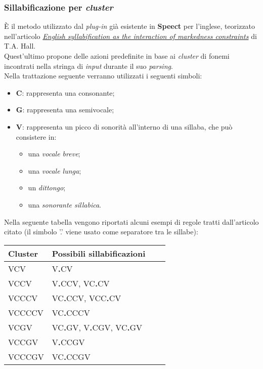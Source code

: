       \subsubsection{Sillabificazione per \textit{cluster}}
           È il metodo utilizzato dal \textit{plug-in} già esistente in \textbf{Speect} per l'inglese, teorizzato
           nell'articolo 
           \href{http://www.zas.gwz-berlin.de/fileadmin/material/ZASPiL_Volltexte/zp37/zaspil37-hall.pdf}
           {\textit{English syllabification as the interaction of markedness constraints}} di T.A. Hall. \\
           Quest'ultimo propone delle azioni predefinite in base ai \textit{cluster} di fonemi incontrati nella stringa di \textit{input} durante il suo \textit{parsing}. \\
           Nella trattazione seguente verranno utilizzati i seguenti simboli:
           \begin{itemize}
             \item \textbf{C}: rappresenta una consonante;
             \item \textbf{G}: rappresenta una semivocale;
             \item \textbf{V}: rappresenta un picco di sonorità all'interno di una sillaba, che può consistere in:
                               \begin{itemize}
                                 \item una \textit{vocale breve};
                                 \item una \textit{vocale lunga};
                                 \item un \textit{dittongo};
                                 \item una \textit{sonorante sillabica}.
                               \end{itemize}
           \end{itemize}
           Nella seguente tabella vengono riportati alcuni esempi di regole tratti dall'articolo citato (il simbolo '.' viene usato come
           separatore tra le sillabe): \newpage
           \begin{center}
             \begin{longtable}{ | >{\centering}p{2cm} | >{\centering}p{4cm} | >{\centering}p{1.5cm} | >{\centering}p{2cm} | }
               \hline
               \textbf{Cluster} & \textbf{Possibili sillabificazioni} \tabularnewline \hline
                 VCV & V\textbf{.}CV  \tabularnewline \hline
                 VCCV & V\textbf{.}CCV, VC\textbf{.}CV  \tabularnewline \hline
                 VCCCV & VC\textbf{.}CCV, VCC\textbf{.}CV  \tabularnewline \hline
                 VCCCCV & VC\textbf{.}CCCV  \tabularnewline \hline
                 VCGV & VC\textbf{.}GV, V\textbf{.}CGV, VC\textbf{.}GV  \tabularnewline \hline
                 VCCGV & V\textbf{.}CCGV  \tabularnewline \hline
                 VCCCGV & VC\textbf{.}CCGV  \tabularnewline \hline
             \end{longtable}
           \end{center}

